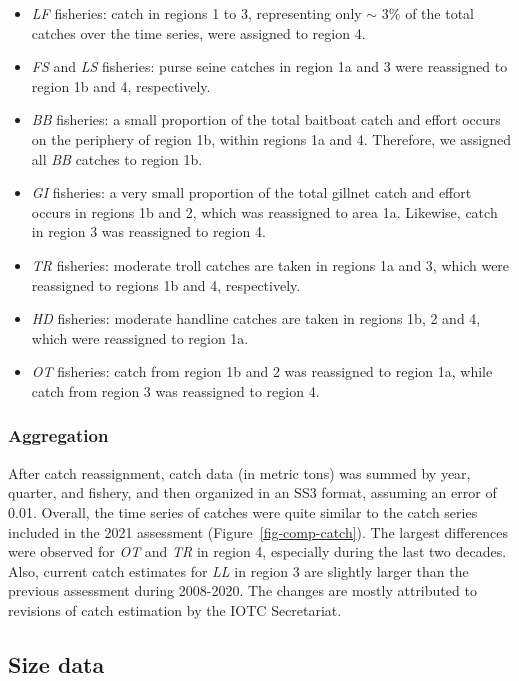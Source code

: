 \documentclass[
]{scrartcl}
\begin{document}
\begin{itemize}
\item
  \emph{LF} fisheries: catch in regions 1 to 3, representing only
  \(\sim\) 3\% of the total catches over the time series, were assigned
  to region 4.
\item
  \emph{FS} and \emph{LS} fisheries: purse seine catches in region 1a
  and 3 were reassigned to region 1b and 4, respectively.
\item
  \emph{BB} fisheries: a small proportion of the total baitboat catch
  and effort occurs on the periphery of region 1b, within regions 1a and
  4. Therefore, we assigned all \emph{BB} catches to region 1b.
\item
  \emph{GI} fisheries: a very small proportion of the total gillnet
  catch and effort occurs in regions 1b and 2, which was reassigned to
  area 1a. Likewise, catch in region 3 was reassigned to region 4.
\item
  \emph{TR} fisheries: moderate troll catches are taken in regions 1a
  and 3, which were reassigned to regions 1b and 4, respectively.
\item
  \emph{HD} fisheries: moderate handline catches are taken in regions
  1b, 2 and 4, which were reassigned to region 1a.
\item
  \emph{OT} fisheries: catch from region 1b and 2 was reassigned to
  region 1a, while catch from region 3 was reassigned to region 4.
\end{itemize}

\subsubsection{Aggregation}\label{aggregation}

After catch reassignment, catch data (in metric tons) was summed by
year, quarter, and fishery, and then organized in an SS3 format,
assuming an error of 0.01. Overall, the time series of catches were
quite similar to the catch series included in the 2021 assessment
(Figure~\ref{fig-comp-catch}). The largest differences were observed for
\emph{OT} and \emph{TR} in region 4, especially during the last two
decades. Also, current catch estimates for \emph{LL} in region 3 are
slightly larger than the previous assessment during 2008-2020. The
changes are mostly attributed to revisions of catch estimation by the
IOTC Secretariat.

\subsection{Size data}\label{size-data}
\end{document}
